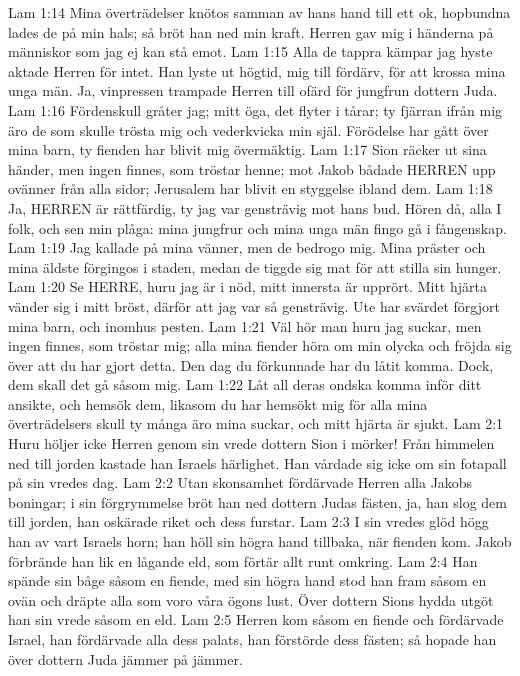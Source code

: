 Lam 1:14  Mina överträdelser knötos samman av hans hand till ett ok, hopbundna lades de på min hals; så bröt han ned min kraft. Herren gav mig i händerna på människor som jag ej kan stå emot.
Lam 1:15  Alla de tappra kämpar jag hyste aktade Herren för intet. Han lyste ut högtid, mig till fördärv, för att krossa mina unga män. Ja, vinpressen trampade Herren till ofärd för jungfrun dottern Juda.
Lam 1:16  Fördenskull gråter jag; mitt öga, det flyter i tårar; ty fjärran ifrån mig äro de som skulle trösta mig och vederkvicka min själ. Förödelse har gått över mina barn, ty fienden har blivit mig övermäktig.
Lam 1:17  Sion räcker ut sina händer, men ingen finnes, som tröstar henne; mot Jakob bådade HERREN upp ovänner från alla sidor; Jerusalem har blivit en styggelse ibland dem.
Lam 1:18  Ja, HERREN är rättfärdig, ty jag var gensträvig mot hans bud. Hören då, alla I folk, och sen min plåga: mina jungfrur och mina unga män fingo gå i fångenskap.
Lam 1:19  Jag kallade på mina vänner, men de bedrogo mig. Mina präster och mina äldste förgingos i staden, medan de tiggde sig mat för att stilla sin hunger.
Lam 1:20  Se HERRE, huru jag är i nöd, mitt innersta är upprört. Mitt hjärta vänder sig i mitt bröst, därför att jag var så gensträvig. Ute har svärdet förgjort mina barn, och inomhus pesten.
Lam 1:21  Väl hör man huru jag suckar, men ingen finnes, som tröstar mig; alla mina fiender höra om min olycka och fröjda sig över att du har gjort detta. Den dag du förkunnade har du låtit komma. Dock, dem skall det gå såsom mig.
Lam 1:22  Låt all deras ondska komma inför ditt ansikte, och hemsök dem, likasom du har hemsökt mig för alla mina överträdelsers skull ty många äro mina suckar, och mitt hjärta är sjukt.
Lam 2:1  Huru höljer icke Herren genom sin vrede dottern Sion i mörker! Från himmelen ned till jorden kastade han Israels härlighet. Han vårdade sig icke om sin fotapall på sin vredes dag.
Lam 2:2  Utan skonsamhet fördärvade Herren alla Jakobs boningar; i sin förgrymmelse bröt han ned dottern Judas fästen, ja, han slog dem till jorden, han oskärade riket och dess furstar.
Lam 2:3  I sin vredes glöd högg han av vart Israels horn; han höll sin högra hand tillbaka, när fienden kom. Jakob förbrände han lik en lågande eld, som förtär allt runt omkring.
Lam 2:4  Han spände sin båge såsom en fiende, med sin högra hand stod han fram såsom en ovän och dräpte alla som voro våra ögons lust. Över dottern Sions hydda utgöt han sin vrede såsom en eld.
Lam 2:5  Herren kom såsom en fiende och fördärvade Israel, han fördärvade alla dess palats, han förstörde dess fästen; så hopade han över dottern Juda jämmer på jämmer.
